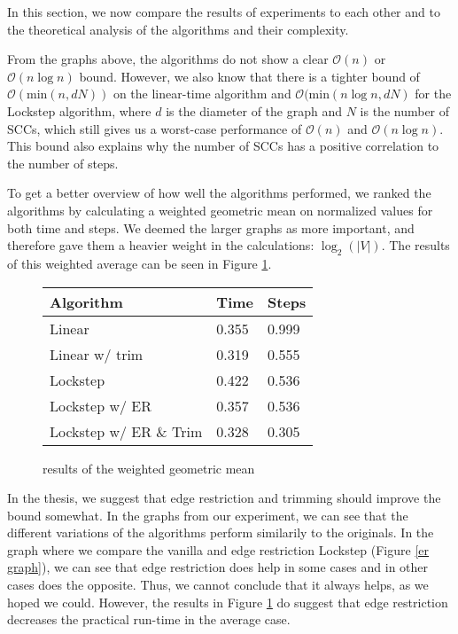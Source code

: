 \documentclass[../master/master.tex]{subfiles}
\begin{document}
In this section, we now compare the results of experiments to each other and to the theoretical analysis of the algorithms and their complexity.

From the graphs above, the algorithms do not show a clear $\mathcal{O}(n)$ or $\mathcal{O}(n\log n)$ bound. However, we also know that there is a tighter bound of $\mathcal{O}(\text{min}(n, dN))$ on the linear-time algorithm and $\mathcal{O}(\text{min}(n\log n, dN)$ for the Lockstep algorithm, where $d$ is the diameter of the graph and $N$ is the number of SCCs, which still gives us a worst-case performance of $\mathcal{O}(n)$ and $\mathcal{O}(n\log n)$. This bound also explains why the number of SCCs has a positive correlation to the number of steps.

To get a better overview of how well the algorithms performed, we ranked the algorithms by calculating a weighted geometric mean on normalized values for both time and steps. We deemed the larger graphs as more important, and therefore gave them a heavier weight in the calculations: $\log_2(|V|)$. The results of this weighted average can be seen in Figure \ref{mean}.

\begin{figure}[h]
  \centering
  \begin{tabular}{|l|l|l|}
    \hline
    Algorithm              & Time   & Steps  \\
    \hline
    Linear                 & 0.355 & 0.999 \\
    \hline
    Linear w/ trim         & 0.319 & 0.555 \\
    \hline
    Lockstep               & 0.422 & 0.536 \\
    \hline
    Lockstep w/ ER         & 0.357 & 0.536 \\
    \hline
    Lockstep w/ ER \& Trim & 0.328 & 0.305 \\
    \hline
\end{tabular}
\caption{results of the weighted geometric mean}\label{mean}
\end{figure}

In the thesis, we suggest that edge restriction and trimming should improve the bound somewhat. In the graphs from our experiment, we can see that the different variations of the algorithms perform similarily to the originals. In the graph where we compare the vanilla and edge restriction Lockstep (Figure \ref{er graph}), we can see that edge restriction does help in some cases and in other cases does the opposite. Thus, we cannot conclude that it always helps, as we hoped we could. However, the results in Figure \ref{mean} do suggest that edge restriction decreases the practical run-time in the average case. 
\end{document}
